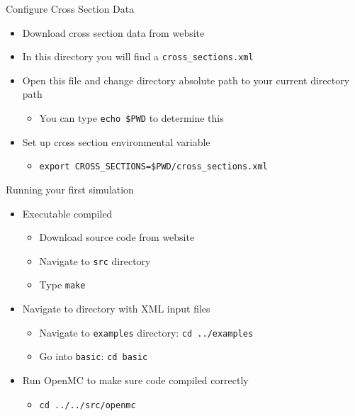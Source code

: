 \documentclass[serif]{beamer}
\begin{document}
\begin{frame}{Configure Cross Section Data}

  \begin{itemize}
    \item Download cross section data from website\vfill
    \item In this directory you will find a \texttt{cross\_sections.xml}\vfill
    \item Open this file and change directory absolute path to your current directory path
      \begin{itemize}
         \item You can type \texttt{echo \$PWD} to determine this
      \end{itemize}\vfill
    \item Set up cross section environmental variable
      \begin{itemize}
         \item \texttt{export CROSS\_SECTIONS=\$PWD/cross\_sections.xml}
      \end{itemize}
  
  \end{itemize}
\end{frame}


\begin{frame}{Running your first simulation}
  \begin{itemize}
  \item<1-> Executable compiled
    \begin{itemize}
      \item Download source code from website
      \item Navigate to \texttt{src} directory
      \item Type \texttt{make}
    \end{itemize}\vfill
  \item<1-> Navigate to directory with XML input files
    \begin{itemize}
      \item Navigate to \texttt{examples} directory: \texttt{cd ../examples}
      \item Go into \texttt{basic}: \texttt{cd basic}
    \end{itemize}\vfill
  \item<1-> Run OpenMC to make sure code compiled correctly
     \begin{itemize}
       \item \texttt{cd ../../src/openmc}
     \end{itemize}
  \end{itemize}
\end{frame}
\end{document}
